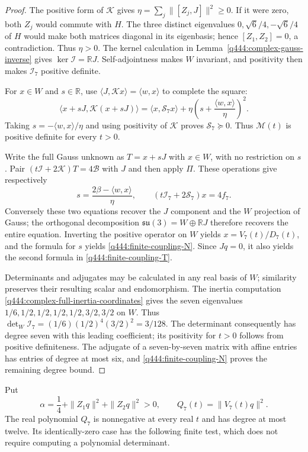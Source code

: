 \begin{proof}
The positive form of $\mathcal K$ gives
$\eta=\sum_j\|[Z_j,J]\|^2\ge0$. If it were zero, both $Z_j$ would
commute with $H$. The three distinct eigenvalues $0,\sqrt6/4,-\sqrt6/4$
of $H$ would make both matrices diagonal in its eigenbasis; hence
$[Z_1,Z_2]=0$, a contradiction. Thus $\eta>0$.
The kernel calculation in Lemma~\ref{q444:complex-gauss-inverse} gives
$\ker\mathcal I=\mathbb RJ$. Self-adjointness makes $W$ invariant, and
positivity then makes $\mathcal I_7$ positive definite.

For $x\in W$ and $s\in\mathbb R$, use
$\langle J,\mathcal Kx\rangle=\langle w,x\rangle$ to complete the square:
\[
 \langle x+sJ,\mathcal K(x+sJ)\rangle
 =\langle x,\mathcal S_7x\rangle
   +\eta\left(s+\frac{\langle w,x\rangle}{\eta}\right)^2.
\]
Taking $s=-\langle w,x\rangle/\eta$ and using positivity of
$\mathcal K$ proves $\mathcal S_7\succeq0$.
Thus $\mathscr M(t)$ is positive definite for every $t>0$.

Write the full Gauss unknown as $T=x+sJ$ with $x\in W$, with no
restriction on $s$. Pair
$(t\mathcal I+2\mathcal K)T=4\mathscr B$ with $J$ and then apply $\Pi$.
These operations give respectively
\[
 s=\frac{2\beta-\langle w,x\rangle}{\eta},\qquad
 (t\mathcal I_7+2\mathcal S_7)x=4f_7.
\]
Conversely these two equations recover the $J$ component and the $W$
projection of Gauss; the orthogonal decomposition
$\mathfrak{su}(3)=W\oplus\mathbb RJ$ therefore recovers the entire
equation. Inverting the positive operator on $W$ yields
$x=V_7(t)/D_7(t)$, and the formula for $s$ yields
\eqref{q444:finite-coupling-N}. Since $Jq=0$, it also yields the second
formula in \eqref{q444:finite-coupling-T}.

Determinants and adjugates may be calculated in any real basis of $W$;
similarity preserves their resulting scalar and endomorphism. The
inertia computation \eqref{q444:complex-full-inertia-coordinates} gives
the seven eigenvalues $1/6,1/2,1/2,1/2,1/2,3/2,3/2$ on $W$.
Thus $\det_W\mathcal I_7=(1/6)(1/2)^4(3/2)^2=3/128$.
The determinant consequently has degree seven with this leading
coefficient; its positivity for $t>0$ follows from positive definiteness.
The adjugate of a seven-by-seven matrix with affine entries has entries
of degree at most six, and \eqref{q444:finite-coupling-N} proves the
remaining degree bound.
\end{proof}

Put
\[
 \alpha=\frac14+\|Z_1q\|^2+\|Z_2q\|^2>0,\qquad
 Q_7(t)=\|V_7(t)q\|^2.
\]
The real polynomial $Q_7$ is nonnegative at every real $t$ and has degree
at most twelve. Its identically-zero case has the following finite test,
which does not require computing a polynomial determinant.

